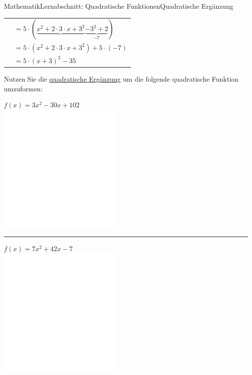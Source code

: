 \documentclass[11pt,twocolumn,oneside,openany,headings=optiontotoc,11pt,numbers=noenddot]{article}
\begin{document}
\begin{worksheet}{Mathematik}{Lernabschnitt: Quadratische Funktionen}{Quadratische Ergänzung}
\begin{tabularx}{0.48\textwidth}{lX}
			& \(= 5\cdot(\underbrace{x^2 + 2\cdot{}3\cdot{}x + 3^2} \underbrace{-3^2 + 2}_{-7})\)\\
			& \(= 5\cdot(x^2 + 2\cdot{}3\cdot{}x + 3^2) + 5\cdot(-7)\)\\
			& \(= 5\cdot(x+3)^2 -35\)
		\end{tabularx}
		\newpage
		Nutzen Sie die \underline{quadratische Ergänzung} um die folgende quadratische Funktion umzuformen:\\
		\par\noindent
		\(f(x) = 3x^2 - 30x +102\)\\
		\includegraphics[width=0.45\textwidth]{../../empty.jpg}\\
		\rule{0.48\textwidth}{0.1pt}
		\par\noindent
		\(f(x) = 7x^2 + 42x - 7\)\\
		\includegraphics[width=0.45\textwidth]{../../empty.jpg}\\
	\end{worksheet}
\end{document}
